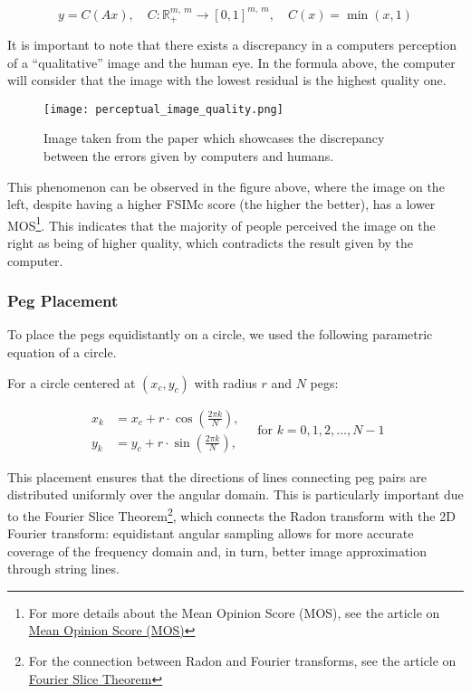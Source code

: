 \begin{equation}
y = C(Ax), \quad
C : \mathbb{R}_+^{m, \ m} \rightarrow [0, 1]^{m, \ m}, \quad
C(x) = \min(x, 1)
\label{clamping_operator}
\end{equation}

It is important to note that there exists a discrepancy in a computers perception of a \enquote{qualitative} image and the human eye. In the formula above, the computer will consider that the image with the lowest residual is the highest quality one.

\begin{figure}[H]
    \centering
    \texttt{[image: perceptual\_image\_quality.png]}
    \caption{Image taken from the paper \cite{perceptual_image_quality} which showcases the discrepancy between the errors given by computers and humans.}
    \label{fig:perceptual_image_quality}
\end{figure}

This phenomenon can be observed in the figure above, where the image on the left, despite having a higher FSIMc score \cite{fsimc} (the higher the better), has a lower MOS\footnote{For more details about the Mean Opinion Score (MOS), see the article on \href{https://en.wikipedia.org/wiki/Mean_opinion_score}{Mean Opinion Score (MOS)}}. This indicates that the majority of people perceived the image on the right as being of higher quality, which contradicts the result given by the computer.

\subsubsection{Peg Placement}

To place the pegs equidistantly on a circle, we used the following parametric equation of a circle.

For a circle centered at \((x_c, y_c)\) with radius \(r\) and \(N\) pegs:

\[
\begin{aligned}
x_k &= x_c + r \cdot \cos\left( \frac{2\pi k}{N} \right), \\
y_k &= y_c + r \cdot \sin\left( \frac{2\pi k}{N} \right),
\end{aligned}
\quad \text{for } k = 0, 1, 2, \dots, N - 1
\]

This placement ensures that the directions of lines connecting peg pairs are distributed uniformly over the angular domain. This is particularly important due to the Fourier Slice Theorem\footnote{For the connection between Radon and Fourier transforms, see the article on \href{https://en.wikipedia.org/wiki/Projection-slice_theorem}{Fourier Slice Theorem}}, which connects the Radon transform with the 2D Fourier transform: equidistant angular sampling allows for more accurate coverage of the frequency domain and, in turn, better image approximation through string lines.


